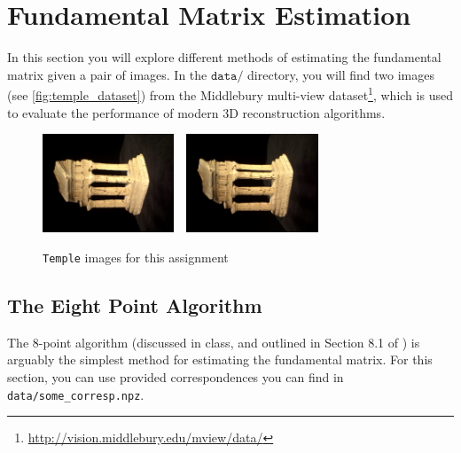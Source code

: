 \section{Fundamental Matrix Estimation}
\label{sec:fundmatrix}

In this section you will explore different methods of estimating the fundamental matrix given a pair of images. In the $\texttt{data/}$ directory, you will find two images (see \autoref{fig:temple_dataset}) from the Middlebury multi-view dataset\footnote{\url{http://vision.middlebury.edu/mview/data/}}, which is used to evaluate the performance of modern 3D reconstruction algorithms.
\begin{figure}[h]
    \centering
    \includegraphics[width=0.35\textwidth]{images/im1.png}\ \
    \includegraphics[width=0.35\textwidth]{images/im2.png}
\caption{\texttt{Temple} images for this assignment}
    \label{fig:temple_dataset}
\end{figure}


\subsection{The Eight Point Algorithm}

The 8-point algorithm (discussed in class, and outlined in Section 8.1 of \cite{forsyth2002computer}) is arguably the simplest method for estimating the fundamental matrix. For this section, you can use provided correspondences you can find in \texttt{data/some\_corresp.npz}.


